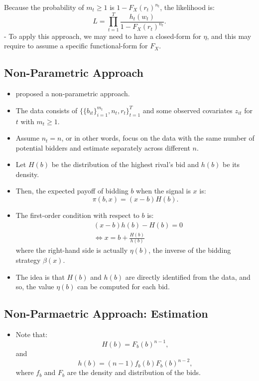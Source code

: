 \documentclass[]{book}
\providecommand{\tightlist}{%
  \setlength{\itemsep}{0pt}\setlength{\parskip}{0pt}}
\begin{document}
Because the probability of \(m_t \ge 1\) is \(1 - F_X(r_t)^{n_t}\), the
likelihood is: \[
L = \prod_{t = 1}^T \frac{h_t(w_t)}{1 - F_X(r_t)^{n_t}}.
\] - To apply this approach, we may need to have a closed-form for
\(\eta\), and this may require to assume a specific functional-form for
\(F_X\).

\subsection{Non-Parametric Approach}\label{non-parametric-approach}

\begin{itemize}
\tightlist
\item
  \citet{guerreOptimalNonparametricEstimation2000} proposed a
  non-parametric approach.
\item
  The data consists of
  \(\{\{b_{it}\}_{i = 1}^{m_t}, n_t, r_t\}_{t = 1}^T\) and some observed
  covariates \(z_{it}\) for \(t\) with \(m_t \ge 1\).
\item
  Assume \(n_t = n\), or in other words, focus on the data with the same
  number of potential bidders and estimate separately across different
  \(n\).
\item
  Let \(H(b)\) be the distribution of the highest rival's bid and
  \(h(b)\) be its density.
\item
  Then, the expected payoff of bidding \(b\) when the signal is \(x\)
  is: \[
  \pi(b, x) = (x - b) H(b).
  \]
\item
  The first-order condition with respect to \(b\) is: \[
  \begin{split}
  & (x - b) h(b) - H(b) = 0\\
  &\Leftrightarrow x = b + \frac{H(b)}{h(b)}
  \end{split}
  \] where the right-hand side is actually \(\eta(b)\), the inverse of
  the bidding strategy \(\beta(x)\).
\item
  The idea is that \(H(b)\) and \(h(b)\) are directly identified from
  the data, and so, the value \(\eta(b)\) can be computed for each bid.
\end{itemize}

\subsection{Non-Parmaetric Approach:
Estimation}\label{non-parmaetric-approach-estimation}

\begin{itemize}
\tightlist
\item
  Note that: \[
  H(b) = F_b(b)^{n - 1},
  \] and \[
  h(b) = (n - 1) f_b(b) F_b(b)^{n - 2},
  \] where \(f_b\) and \(F_b\) are the density and distribution of the
  bids.
\end{itemize}
\end{document}
